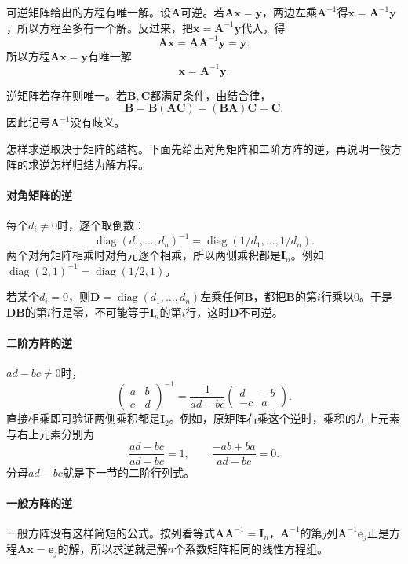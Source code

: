 可逆矩阵给出的方程有唯一解。设$\bm A$可逆。若$\bm A\bm x=\bm y$，两边左乘$\bm A^{-1}$得$\bm x=\bm A^{-1}\bm y$，所以方程至多有一个解。反过来，把$\bm x=\bm A^{-1}\bm y$代入，得
\[
 \bm A\bm x=\bm A\bm A^{-1}\bm y=\bm y.
\]
所以方程$\bm A\bm x=\bm y$有唯一解
\[
 \bm x=\bm A^{-1}\bm y.
\]

逆矩阵若存在则唯一。若$\bm B,\bm C$都满足条件，由结合律，
\[
 \bm B=\bm B(\bm A\bm C)=(\bm B\bm A)\bm C=\bm C.
\]
因此记号$\bm A^{-1}$没有歧义。

怎样求逆取决于矩阵的结构。下面先给出对角矩阵和二阶方阵的逆，再说明一般方阵的求逆怎样归结为解方程。

\paragraph{对角矩阵的逆}
每个$d_i\neq0$时，逐个取倒数：
\[
 \operatorname{diag}(d_1,\ldots,d_n)^{-1}=\operatorname{diag}(1/d_1,\ldots,1/d_n).
\]
两个对角矩阵相乘时对角元逐个相乘，所以两侧乘积都是$\bm I_n$。例如$\operatorname{diag}(2,1)^{-1}=\operatorname{diag}(1/2,1)$。

若某个$d_i=0$，则$\bm D=\operatorname{diag}(d_1,\ldots,d_n)$左乘任何$\bm B$，都把$\bm B$的第$i$行乘以$0$。于是$\bm D\bm B$的第$i$行是零，不可能等于$\bm I_n$的第$i$行，这时$\bm D$不可逆。

\paragraph{二阶方阵的逆}
$ad-bc\neq0$时，
\begin{equation}
 \begin{pmatrix}a&b\\c&d\end{pmatrix}^{-1}=\frac1{ad-bc}\begin{pmatrix}d&-b\\-c&a\end{pmatrix}.
 \label{eq:ls-inverse-two-by-two}
\end{equation}
直接相乘即可验证两侧乘积都是$\bm I_2$。例如，原矩阵右乘这个逆时，乘积的左上元素与右上元素分别为
\[
 \frac{ad-bc}{ad-bc}=1,\qquad
 \frac{-ab+ba}{ad-bc}=0.
\]
分母$ad-bc$就是下一节的二阶行列式。

\paragraph{一般方阵的逆}
一般方阵没有这样简短的公式。按列看等式$\bm A\bm A^{-1}=\bm I_n$，$\bm A^{-1}$的第$j$列$\bm A^{-1}\bm e_j$正是方程$\bm A\bm x=\bm e_j$的解，所以求逆就是解$n$个系数矩阵相同的线性方程组。

